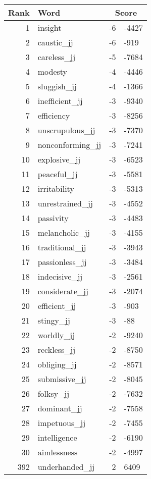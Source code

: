 \begin{longtable}[!htbp]{| rlr@{.}l |}
    \hline
    \textbf{Rank} & \textbf{Word} & \multicolumn{2}{c|}{\textbf{Score}} \\
    \hline
    \endhead
    1 & insight & -6 & -4427 \\
    2 & caustic\_jj & -6 & -919 \\
    3 & careless\_jj & -5 & -7684 \\
    4 & modesty & -4 & -4446 \\
    5 & sluggish\_jj & -4 & -1366 \\
    6 & inefficient\_jj & -3 & -9340 \\
    7 & efficiency & -3 & -8256 \\
    8 & unscrupulous\_jj & -3 & -7370 \\
    9 & nonconforming\_jj & -3 & -7241 \\
    10 & explosive\_jj & -3 & -6523 \\
    11 & peaceful\_jj & -3 & -5581 \\
    12 & irritability & -3 & -5313 \\
    13 & unrestrained\_jj & -3 & -4552 \\
    14 & passivity & -3 & -4483 \\
    15 & melancholic\_jj & -3 & -4155 \\
    16 & traditional\_jj & -3 & -3943 \\
    17 & passionless\_jj & -3 & -3484 \\
    18 & indecisive\_jj & -3 & -2561 \\
    19 & considerate\_jj & -3 & -2074 \\
    20 & efficient\_jj & -3 & -903 \\
    21 & stingy\_jj & -3 & -88 \\
    22 & worldly\_jj & -2 & -9240 \\
    23 & reckless\_jj & -2 & -8750 \\
    24 & obliging\_jj & -2 & -8571 \\
    25 & submissive\_jj & -2 & -8045 \\
    26 & folksy\_jj & -2 & -7632 \\
    27 & dominant\_jj & -2 & -7558 \\
    28 & impetuous\_jj & -2 & -7455 \\
    29 & intelligence & -2 & -6190 \\
    30 & aimlessness & -2 & -4997 \\
    392 & underhanded\_jj & 2 & 6409 \\

\end{longtable}
